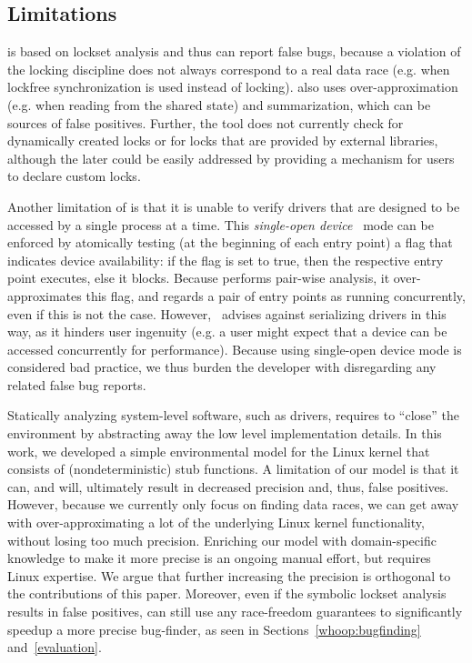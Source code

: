 \subsection{Limitations}
\label{whoop:limitations}

\whoop is based on lockset analysis and thus can report false bugs, because a violation of the locking discipline does not always correspond to a real data race (e.g. when lockfree synchronization is used instead of locking). \whoop also uses over-approximation (e.g. when reading from the shared state) and summarization, which can be sources of false positives. Further, the tool does not currently check for dynamically created locks or for locks that are provided by external libraries, although the later could be easily addressed by providing a mechanism for users to declare custom locks.

Another limitation of \whoop is that it is unable to verify drivers that are designed to be accessed by a single process at a time. This \emph{single-open device}~\cite{corbet2005linux} mode can be enforced by atomically testing (at the beginning of each entry point) a flag that indicates device availability: if the flag is set to true, then the respective entry point executes, else it blocks. Because \whoop performs pair-wise analysis, it over-approximates this flag, and regards a pair of entry points as running concurrently, even if this is not the case. However,~\cite{corbet2005linux} advises against serializing drivers in this way, as it hinders user ingenuity (e.g. a user might expect that a device can be accessed concurrently for performance). Because using single-open device mode is considered bad practice, we thus burden the developer with disregarding any related false bug reports.

Statically analyzing system-level software, such as drivers, requires to ``close'' the environment by abstracting away the low level implementation details. In this work, we developed a simple environmental model for the Linux kernel that consists of (nondeterministic) stub functions. A limitation of our model is that it can, and will, ultimately result in decreased precision and, thus, false positives. However, because we currently only focus on finding data races, we can get away with over-approximating a lot of the underlying Linux kernel functionality, without losing too much precision. Enriching our model with domain-specific knowledge to make it more precise is an ongoing manual effort, but requires Linux expertise. We argue that further increasing the precision is orthogonal to the contributions of this paper. Moreover, even if the symbolic lockset analysis results in false positives, \whoop can still use any race-freedom guarantees to significantly speedup a more precise bug-finder, as seen in Sections~\ref{whoop:bugfinding} and~\ref{evaluation}.
